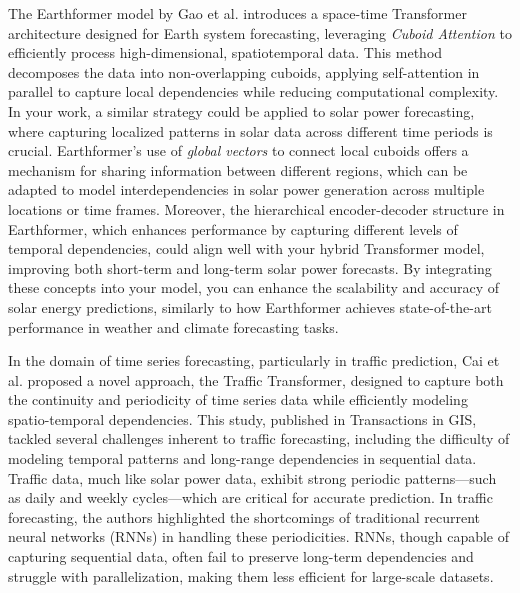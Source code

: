 \documentclass[12pt]{uomthesis}
\begin{document}
The Earthformer model by Gao et al. \cite{gao2022earthformer} introduces a space-time Transformer architecture designed for Earth system forecasting, leveraging \textit{Cuboid Attention} to efficiently process high-dimensional, spatiotemporal data. This method decomposes the data into non-overlapping cuboids, applying self-attention in parallel to capture local dependencies while reducing computational complexity. In your work, a similar strategy could be applied to solar power forecasting, where capturing localized patterns in solar data across different time periods is crucial. Earthformer's use of \textit{global vectors} to connect local cuboids offers a mechanism for sharing information between different regions, which can be adapted to model interdependencies in solar power generation across multiple locations or time frames. Moreover, the hierarchical encoder-decoder structure in Earthformer, which enhances performance by capturing different levels of temporal dependencies, could align well with your hybrid Transformer model, improving both short-term and long-term solar power forecasts. By integrating these concepts into your model, you can enhance the scalability and accuracy of solar energy predictions, similarly to how Earthformer achieves state-of-the-art performance in weather and climate forecasting tasks.

In the domain of time series forecasting, particularly in traffic prediction, Cai et al. \cite{cai2020traffic} proposed a novel approach, the Traffic Transformer, designed to capture both the continuity and periodicity of time series data while efficiently modeling spatio-temporal dependencies. This study, published in Transactions in GIS, tackled several challenges inherent to traffic forecasting, including the difficulty of modeling temporal patterns and long-range dependencies in sequential data. Traffic data, much like solar power data, exhibit strong periodic patterns—such as daily and weekly cycles—which are critical for accurate prediction. In traffic forecasting, the authors highlighted the shortcomings of traditional recurrent neural networks (RNNs) in handling these periodicities. RNNs, though capable of capturing sequential data, often fail to preserve long-term dependencies and struggle with parallelization, making them less efficient for large-scale datasets.
\end{document}

